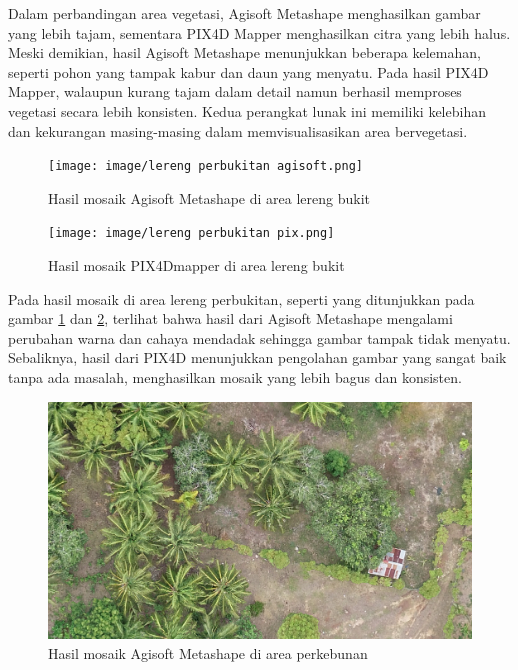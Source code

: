 Dalam perbandingan area vegetasi, Agisoft Metashape menghasilkan gambar yang lebih tajam, sementara PIX4D Mapper menghasilkan citra yang lebih halus. Meski demikian, hasil Agisoft Metashape menunjukkan beberapa kelemahan, seperti pohon yang tampak kabur dan daun yang menyatu. Pada hasil PIX4D Mapper, walaupun kurang tajam dalam detail namun berhasil memproses vegetasi secara lebih konsisten. Kedua perangkat lunak ini memiliki kelebihan dan kekurangan masing-masing dalam memvisualisasikan area bervegetasi.

\begin{figure} [H]
    \centering
    \texttt{[image: image/lereng perbukitan agisoft.png]}
    \caption{Hasil mosaik Agisoft Metashape di area lereng bukit}
    \label{visual lereng 1}
\end{figure}

\begin{figure} [H]
    \centering
    \texttt{[image: image/lereng perbukitan pix.png]}
    \caption{Hasil mosaik PIX4Dmapper di area lereng bukit}
    \label{visual lereng 2}
\end{figure}

Pada hasil mosaik di area lereng perbukitan, seperti yang ditunjukkan pada gambar \ref{visual lereng 1} dan \ref{visual lereng 2}, terlihat bahwa hasil dari Agisoft Metashape mengalami perubahan warna dan cahaya mendadak sehingga gambar tampak tidak menyatu. Sebaliknya, hasil dari PIX4D menunjukkan pengolahan gambar yang sangat baik tanpa ada masalah, menghasilkan mosaik yang lebih bagus dan konsisten.

\begin{figure} [H]
    \centering
    \includegraphics [width=1\linewidth]{image/jalan agisoft.png}
    \caption{Hasil mosaik Agisoft Metashape di area perkebunan}
    \label{visual jalan 1}
\end{figure}


